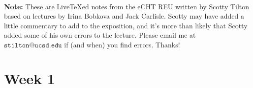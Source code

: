 \documentclass{book}
\begin{document}
    \maketitle

    ~
    \vspace{3in}
    \begin{center}
        \noindent \textbf{Note:} These are Live\TeX ed notes from the eCHT REU written by Scotty Tilton based on lectures by Irina Bobkova and Jack Carlisle. Scotty may have added a little commentary to add to the exposition, and it's more than likely that Scotty added some of his own errors to the lecture. Please email me at $\texttt{stilton@ucsd.edu}$ if (and when) you find errors. Thanks!
    \end{center}
    \tableofcontents
    \chapter{Week 1}
    
    
    \newpage
    
    
    \newpage
    
    
    \newpage
    
    \newpage
    
    \newpage
    
    \newpage
    

    \newpage
    
    \newpage
    \newpage
    
    
    \printindex
\end{document}
